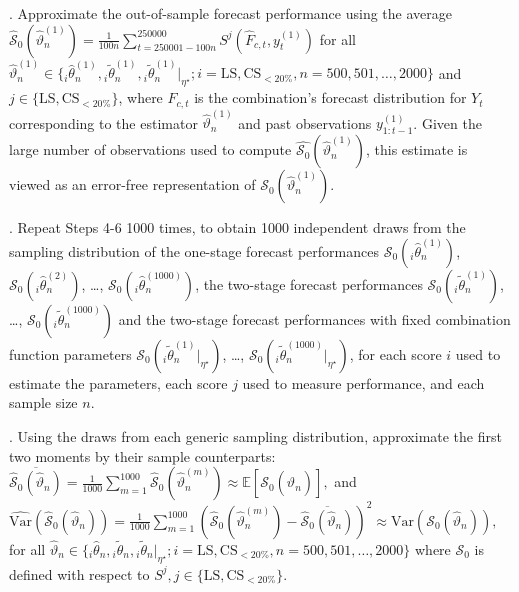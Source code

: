 \documentclass[12pt]{article}
\theoremstyle{definition}
\theoremstyle{remark}
\begin{document}
. Approximate the out-of-sample forecast performance using the average $\hat{\mathcal{S}}_{0}(\hat{\vartheta}^{(1)}_n) = \frac{1}{100n} \sum_{t = 250001 - 100n}^{250000} S^j(\hat{F}_{c,t}, y^{(1)}_{t})$ for all $\hat{\vartheta}^{(1)}_n \in \{{}_i\hat{\theta}^{(1)}_n, {}_i\tilde{\theta}^{(1)}_n, {}_i\tilde{\theta}^{(1)}_n|_{\eta^{\star}}; i = \mathrm{LS}, \mathrm{CS}_{<20\%}, n = 500,\allowbreak 501,\allowbreak \ldots,\allowbreak 2000\}$ and $j \in \{ \mathrm{LS}, \mathrm{CS}_{<20\%} \}$, where $\hat{F}_{c,t}$ is the combination's forecast distribution for $Y_t$ corresponding to the estimator $\hat{\vartheta}^{(1)}_n$ and past observations $y^{(1)}_{1:t-1}$. Given the large number of observations used to compute $\hat{\mathcal{S}_0}(\hat{\vartheta}_n^{(1)})$, this estimate is viewed as an error-free representation of $\mathcal{S}_0(\hat{\vartheta}_n^{(1)})$.

\medskip

. Repeat Steps 4-6 1000 times, to obtain 1000 independent draws from the sampling distribution of the one-stage forecast performances $\mathcal{S}_0({}_i \hat{\theta}^{(1)}_n)$, $\mathcal{S}_0({}_i \hat{\theta}^{(2)}_n)$, \ldots, $\mathcal{S}_0({}_i \hat{\theta}^{(1000)}_n)$, the two-stage forecast performances $\mathcal{S}_0({}_i \tilde{\theta}^{(1)}_n)$, \ldots, $\mathcal{S}_0({}_i \tilde{\theta}^{(1000)}_n)$ and the two-stage forecast performances with fixed combination function parameters $\mathcal{S}_0({}_i \tilde{\theta}^{(1)}_n|_{\eta^{\star}})$, \ldots, $\mathcal{S}_0({}_i \tilde{\theta}^{(1000)}_n|_{\eta^{\star}})$, for each score $i$ used to estimate the parameters, each score $j$ used to measure performance, and each sample size $n$.

\medskip

. Using the draws from each generic sampling distribution, approximate the first two moments by their sample counterparts: $\overline{\hat{\mathcal{S}}_0(\hat{\vartheta}_n)} = \frac{1}{1000} \sum_{m = 1}^{1000} \hat{\mathcal{S}}_0(\hat{\vartheta}^{(m)}_n) \approx \mathbb{E}[\mathcal{S}_0(\hat{\vartheta}_n)], $ and $\widehat{\mathrm{Var}}(\hat{\mathcal{S}}_0(\hat{\vartheta}_n)) = \frac{1}{1000} \sum_{m = 1}^{1000} \left( \hat{\mathcal{S}}_0(\hat{\vartheta}^{(m)}_n) - \overline{\hat{\mathcal{S}}_0(\hat{\vartheta}_n)} \right)^2 \approx \mathrm{Var}(\mathcal{S}_0(\hat{\vartheta}_n)),$ for all $\hat{\vartheta}_n \in \{{}_i\hat{\theta}_n, {}_i\tilde{\theta}_n, {}_i\tilde{\theta}_n|_{\eta^{\star}} ;\allowbreak i = \mathrm{LS}, \mathrm{CS}_{<20\%}, n = 500, 501, \ldots, 2000\}$ where $\mathcal{S}_0$ is defined with respect to $S^j, j \in \{\mathrm{LS}, \mathrm{CS}_{<20\%}\}$.
\end{document}
